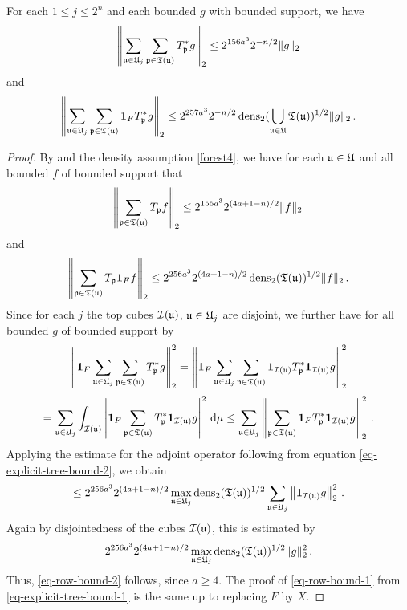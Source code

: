 \begin{lemma}
    \label{row-bound}
    \leanok
    For each $1 \le j \le 2^n$ and each bounded $g$ with bounded support, we have
    \begin{equation}
        \label{eq-row-bound-1}
        \left\| \sum_{{\mathfrak u} \in {\mathfrak U}_j} \sum_{{\mathfrak p} \in {\mathfrak T}({\mathfrak u})} T_{{\mathfrak p}}^* g\right\|_2 \le 2^{156a^3} 2^{-n/2} \|g\|_2
    \end{equation}
    and
    \begin{equation}
        \label{eq-row-bound-2}
        \left\| \sum_{{\mathfrak u} \in {\mathfrak U}_j} \sum_{{\mathfrak p} \in {\mathfrak T}({\mathfrak u})} \mathbf{1}_F T_{{\mathfrak p}}^* g\right\|_2 \le 2^{257a^3} 2^{-n/2} \operatorname{\operatorname{dens}}_2(\bigcup_{{\mathfrak u}\in {\mathfrak U}}{\mathfrak T}({\mathfrak u}))^{1/2} \|g\|_2\,.
    \end{equation}
\end{lemma}

\begin{proof}
    By  and the density assumption \eqref{forest4}, we have for each ${\mathfrak u} \in {\mathfrak U}$ and all bounded $f$ of bounded support that
    \begin{equation}
        \label{eq-explicit-tree-bound-1}
        \left\|\sum_{{\mathfrak p} \in {\mathfrak T}({\mathfrak u})} T_{{\mathfrak p}} f \right\|_{2} \le 2^{155a^3} 2^{(4a+1-n)/2} \|f\|_2\,
    \end{equation}
    and
    \begin{equation}
        \label{eq-explicit-tree-bound-2}
        \left\|\sum_{{\mathfrak p} \in {\mathfrak T}({\mathfrak u})} T_{{\mathfrak p}} \mathbf{1}_F f \right\|_{2} \le 2^{256a^3} 2^{(4a + 1-n)/2} \operatorname{\operatorname{dens}}_2({\mathfrak T}({\mathfrak u}))^{1/2} \|f\|_2\,.
    \end{equation}
    Since for each $j$ the top cubes ${\mathcal{I}}({\mathfrak u})$, ${\mathfrak u} \in {\mathfrak U}_j$ are disjoint, we further have for all bounded $g$ of bounded support by 
    $$
        \left\|\mathbf{1}_F \sum_{{\mathfrak u} \in {\mathfrak U}_j} \sum_{{\mathfrak p} \in {\mathfrak T}({\mathfrak u})} T_{{\mathfrak p}}^* g\right\|_2^2 = \left\|\mathbf{1}_F \sum_{{\mathfrak u} \in {\mathfrak U}_j} \sum_{{\mathfrak p} \in {\mathfrak T}({\mathfrak u})} \mathbf{1}_{{\mathcal{I}}({\mathfrak u})} T_{{\mathfrak p}}^* \mathbf{1}_{{\mathcal{I}}({\mathfrak u})} g\right\|_2^2
    $$
    $$
        = \sum_{{\mathfrak u} \in {\mathfrak U}_j} \int_{{\mathcal{I}}({\mathfrak u})} \left| \mathbf{1}_F \sum_{{\mathfrak p} \in {\mathfrak T}({\mathfrak u})} T_{{\mathfrak p}}^* \mathbf{1}_{{\mathcal{I}}({\mathfrak u})} g\right|^2 \, \mathrm{d}\mu
        \le \sum_{{\mathfrak u} \in {\mathfrak U}_j} \left\|\sum_{{\mathfrak p} \in {\mathfrak T}({\mathfrak u})} \mathbf{1}_F T_{{\mathfrak p}}^* \mathbf{1}_{{\mathcal{I}}({\mathfrak u})} g\right\|_2^2\,.
    $$
    Applying the estimate for the adjoint operator following from equation \eqref{eq-explicit-tree-bound-2}, we obtain
    $$
        \le 2^{256a^3} 2^{(4a+1-n)/2} \max_{{\mathfrak u} \in {\mathfrak U}_j}\operatorname{\operatorname{dens}}_2({\mathfrak T}({\mathfrak u}))^{1/2} \sum_{{\mathfrak u} \in {\mathfrak U}_j} \left\| \mathbf{1}_{{\mathcal{I}}({\mathfrak u})} g\right\|_2^2\,.
    $$
    Again by disjointedness of the cubes ${\mathcal{I}}({\mathfrak u})$, this is estimated by
    $$
        2^{256a^3} 2^{(4a+1-n)/2} \max_{{\mathfrak u} \in {\mathfrak U}_j}\operatorname{\operatorname{dens}}_2({\mathfrak T}({\mathfrak u}))^{1/2} \|g\|_2^2\,.
    $$
    Thus, \eqref{eq-row-bound-2} follows, since $a \ge 4$.
    The proof of \eqref{eq-row-bound-1} from \eqref{eq-explicit-tree-bound-1} is the same up to replacing $F$ by $X$.
\end{proof}


